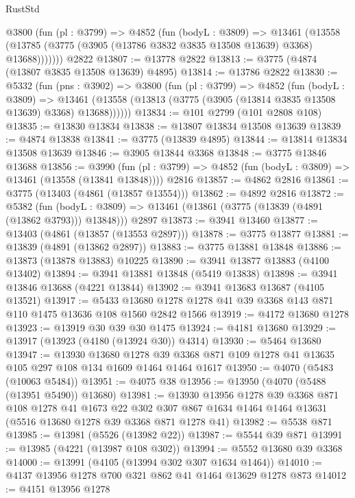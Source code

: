 \begin{lexlean}{RustStd}
\begin{coremodule}
      @3800
        (fun (pl : @3799) =>
        @4852
          (fun (bodyL : @3809) =>
          @13461
            (@13558 (@13785 (@3775 (@3905 (@13786 @3832 @3835 @13508 @13639) @3368) @13688)))))))
    @2822
@13807 := @13778 @2822
@13813 := @3775 (@4874 (@13807 @3835 @13508 @13639) @4895)
@13814 := @13786 @2822
@13830 := @5332
    (fun (pns : @3902) =>
    @3800
      (fun (pl : @3799) =>
      @4852
        (fun (bodyL : @3809) =>
        @13461 (@13558 (@13813 (@3775 (@3905 (@13814 @3835 @13508 @13639) @3368) @13688))))))
@13834 := @101 @2799 (@101 @2808 @108)
@13835 := @13830 @13834
@13838 := @13807 @13834 @13508 @13639
@13839 := @4874 @13838
@13841 := @3775 (@13839 @4895)
@13844 := @13814 @13834 @13508 @13639
@13846 := @3905 @13844 @3368
@13848 := @3775 @13846 @13688
@13856 := @3990
    (fun (pl : @3799) => @4852 (fun (bodyL : @3809) => @13461 (@13558 (@13841 @13848))))
    @2816
@13857 := @4862 @2816
@13861 := @3775 (@13403 (@4861 (@13857 @13554)))
@13862 := @4892 @2816
@13872 := @5382
    (fun (bodyL : @3809) => @13461 (@13861 (@3775 (@13839 (@4891 (@13862 @3793))) @13848)))
    @2897
@13873 := @3941 @13460
@13877 := @13403 (@4861 (@13857 (@13553 @2897)))
@13878 := @3775 @13877
@13881 := @13839 (@4891 (@13862 @2897))
@13883 := @3775 @13881 @13848
@13886 := @13873 (@13878 @13883) @10225
@13890 := @3941 @13877 @13883 (@4100 @13402)
@13894 := @3941 @13881 @13848 (@5419 @13838)
@13898 := @3941 @13846 @13688 (@4221 @13844)
@13902 := @3941 @13683 @13687 (@4105 @13521)
@13917 := @5433 @13680 @1278 @1278 @41 @39 @3368 @143 @871 @110 @1475 @13636 @108 @1560 @2842 @1566
@13919 := @4172 @13680 @1278
@13923 := @13919 @30 @39 @30 @1475
@13924 := @4181 @13680
@13929 := @13917 (@13923 (@4180 (@13924 @30)) @4314)
@13930 := @5464 @13680
@13947 := @13930
    @13680
    @1278
    @39
    @3368
    @871
    @109
    @1278
    @41
    @13635
    @105
    @297
    @108
    @134
    @1609
    @1464
    @1464
    @1617
@13950 := @4070 (@5483 (@10063 @5484))
@13951 := @4075 @38
@13956 := @13950 (@4070 (@5488 (@13951 @5490)) @13680)
@13981 := @13930
    @13956
    @1278
    @39
    @3368
    @871
    @108
    @1278
    @41
    @1673
    @22
    @302
    @307
    @867
    @1634
    @1464
    @1464
    @13631
    (@5516 @13680 @1278 @39 @3368 @871 @1278 @41)
@13982 := @5538 @871
@13985 := @13981 (@5526 (@13982 @22))
@13987 := @5544 @39 @871
@13991 := @13985 (@4221 (@13987 @108 @302))
@13994 := @5552 @13680 @39 @3368
@14000 := @13991 (@4105 (@13994 @302 @307 @1634 @1464))
@14010 := @4137 @13956 @1278 @700 @321 @862 @41 @1464 @13629 @1278 @873
@14012 := @4151 @13956 @1278

\end{coremodule}
\end{lexlean}
